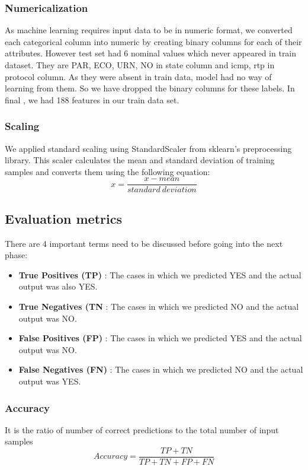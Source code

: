 \documentclass[14pt, conference]{IEEEtran}
\begin{document}
\subsubsection{Numericalization}
As machine learning requires input data to be in numeric format, we converted each categorical column into numeric by creating binary columns for each of their attributes. However test set had 6 nominal values which never appeared in train dataset. They are PAR, ECO, URN, NO in state column and icmp, rtp in protocol column. As they were absent in train data, model had no way of learning from them. So we have dropped the binary columns for these labels. In final , we had 188 features in our train data set.

\subsubsection{Scaling}
We applied standard scaling using StandardScaler from sklearn's preprocessing library. This scaler calculates the mean and standard deviation of training  samples and converts them using the following equation: 
\begin{equation}
    x = \frac{x-mean}{standard\:deviation}
\end{equation}

\subsection{Evaluation metrics}
There are 4 important terms need to be discussed before going into the next phase:
\begin{itemize}
    \item \textbf{True Positives (TP)} : The cases in which we predicted YES and the actual output was also YES.
    \item \textbf{True Negatives (TN} : The cases in which we predicted NO and the actual output was NO.
    \item \textbf{False Positives (FP)} : The cases in which we predicted YES and the actual output was NO.
    \item \textbf{False Negatives (FN)} : The cases in which we predicted NO and the actual output was YES.
\end{itemize}

\subsubsection{Accuracy}
It is the ratio of number of correct predictions to the total number of input samples
\begin{equation}
    Accuracy = \frac{TP+TN}{TP+TN+FP+FN}
\end{equation}
\end{document}
